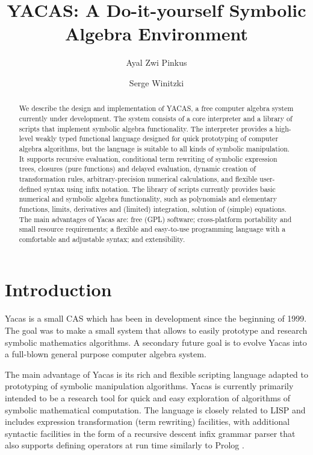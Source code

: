 \documentclass{llncs}
\begin{document}
\title{YACAS: A Do-it-yourself Symbolic Algebra Environment}

\author{Ayal Zwi Pinkus \and Serge Winitzki}

\maketitle

\begin{abstract}
We describe the design and implementation of YACAS, a free computer
algebra system currently under development.  The system consists of a
core interpreter and a library of scripts that implement symbolic algebra
functionality.  The interpreter provides a high-level weakly typed functional
language designed for quick
prototyping of computer algebra algorithms, but the language is suitable to all
kinds of symbolic manipulation. It supports recursive evaluation,
conditional term rewriting of symbolic expression trees, closures (pure
functions) and delayed evaluation, dynamic creation of transformation rules,
arbitrary-precision numerical calculations, and flexible user-defined syntax
using infix notation.  The library of scripts currently
provides basic numerical and symbolic algebra functionality, such as polynomials and
elementary functions, limits, derivatives and (limited) integration,
solution of (simple) equations. The main advantages of Yacas are: free (GPL) software;
cross-platform portability and small resource requirements; a flexible and
easy-to-use programming language with a comfortable and adjustable syntax; and extensibility.
\end{abstract}

\section{Introduction}
Yacas is a small CAS which has been in development since the beginning of 1999.
The goal was to make a small system that allows to easily prototype and
research symbolic mathematics algorithms. A secondary future goal is to evolve
Yacas into a full-blown general purpose computer algebra system.


The main advantage of Yacas is its rich and  flexible scripting language
adapted to prototyping of symbolic manipulation algorithms. Yacas is currently
primarily intended to be a research tool for quick and easy exploration of
algorithms of symbolic mathematical computation. The language is closely
related to LISP \cite{WH89} and includes expression transformation (term rewriting)
facilities, with additional syntactic facilities in the form of a recursive
descent infix grammar parser \cite{ASU86}  that also supports defining operators at
run time similarly to Prolog \cite{B86}.
\end{document}
